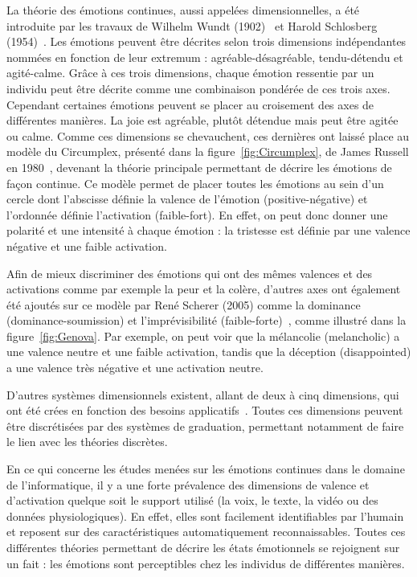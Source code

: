 

La théorie des émotions continues, aussi appelées dimensionnelles, a été introduite par les travaux de Wilhelm Wundt (1902)~\cite{Wundt1902} et Harold Schlosberg (1954)~\cite{Schlosberg1954}. Les émotions peuvent être décrites selon trois dimensions indépendantes nommées en fonction de leur extremum : agréable-désagréable, tendu-détendu et agité-calme. Grâce à ces trois dimensions, chaque émotion ressentie par un individu peut être décrite comme une combinaison pondérée de ces trois axes. Cependant certaines émotions peuvent se placer au croisement des axes de différentes manières. La joie est agréable, plutôt détendue mais peut être agitée ou calme. Comme ces dimensions se chevauchent, ces dernières ont laissé place au modèle du Circumplex, présenté dans la figure~\ref{fig:Circumplex}, de James Russell en 1980~\cite{Russell1980}, devenant la théorie principale permettant de décrire les émotions de façon continue. Ce modèle permet de placer toutes les émotions au sein d'un cercle dont l'abscisse définie la valence de l'émotion (positive-négative) et l'ordonnée définie l'activation (faible-fort). En effet, on peut donc donner une polarité et une intensité à chaque émotion : la tristesse est définie par une valence négative et une faible activation.

Afin de mieux discriminer des émotions qui ont des mêmes valences et des activations comme par exemple la peur et la colère, d'autres axes ont également été ajoutés sur ce modèle par René Scherer (2005) comme la dominance (dominance-soumission) et l'imprévisibilité (faible-forte)~\cite{Scherer2005}, comme illustré dans la figure~\ref{fig:Genova}. Par exemple, on peut voir que la mélancolie (melancholic) a une valence neutre et une faible activation, tandis que la déception (disappointed) a une valence très négative et une activation neutre.


D'autres systèmes dimensionnels existent, allant de deux à cinq dimensions, qui ont été crées en fonction des besoins applicatifs~\cite{Mehrabian1980,Cochrane2009}. Toutes ces dimensions peuvent être discrétisées par des systèmes de graduation, permettant notamment de faire le lien avec les théories discrètes.

En ce qui concerne les études menées sur les émotions continues dans le domaine de l'informatique, il y a une forte prévalence des dimensions de valence et d'activation quelque soit le support utilisé (la voix, le texte, la vidéo ou des données physiologiques). En effet, elles sont facilement identifiables par l'humain et reposent sur des caractéristiques automatiquement reconnaissables.
Toutes ces différentes théories permettant de décrire les états émotionnels se rejoignent sur un fait : les émotions sont perceptibles chez les individus de différentes manières.

